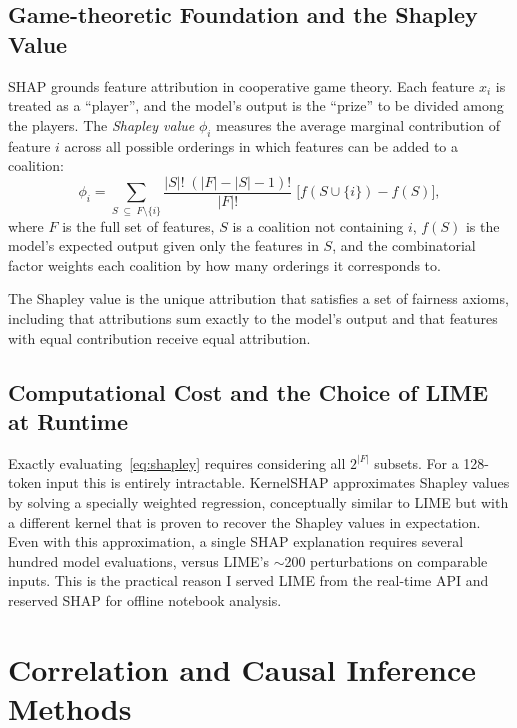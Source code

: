 \subsection{Game-theoretic Foundation and the Shapley Value}

SHAP \citep{lundberg2017shap} grounds feature attribution in cooperative game theory.
Each feature $x_i$ is treated as a ``player'', and the model's output is the
``prize'' to be divided among the players.
The \emph{Shapley value} $\phi_i$ measures the average marginal contribution of feature
$i$ across all possible orderings in which features can be added to a coalition:
\begin{equation}
  \phi_i
  = \sum_{S \;\subseteq\; F \setminus \{i\}}
    \frac{|S|!\;(|F| - |S| - 1)!}{|F|!}
    \;\bigl[f(S \cup \{i\}) - f(S)\bigr],
  \label{eq:shapley}
\end{equation}
where $F$ is the full set of features, $S$ is a coalition not containing $i$,
$f(S)$ is the model's expected output given only the features in $S$, and the
combinatorial factor weights each coalition by how many orderings it corresponds to.

The Shapley value is the unique attribution that satisfies a set of fairness axioms,
including that attributions sum exactly to the model's output and that features with
equal contribution receive equal attribution.

\subsection{Computational Cost and the Choice of LIME at Runtime}

Exactly evaluating~\eqref{eq:shapley} requires considering all $2^{|F|}$ subsets.
For a 128-token input this is entirely intractable.
KernelSHAP \citep{lundberg2017shap} approximates Shapley values by solving a
specially weighted regression, conceptually similar to LIME but with a different
kernel that is proven to recover the Shapley values in expectation.
Even with this approximation, a single SHAP explanation requires several hundred model
evaluations, versus LIME's $\sim$200 perturbations on comparable inputs.
This is the practical reason I served LIME from the real-time API and reserved SHAP
for offline notebook analysis.

\section{Correlation and Causal Inference Methods}

